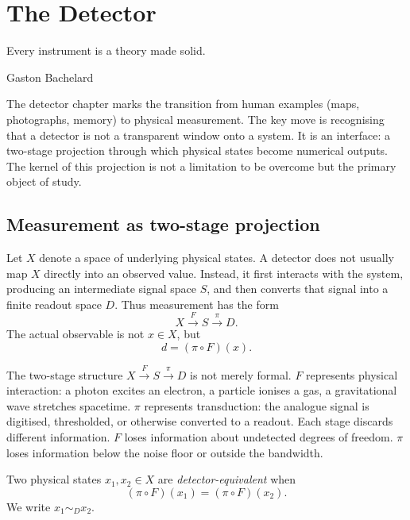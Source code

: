 
\chapter{The Detector}
\label{ch:detector}

\epigraph{%
  Every instrument is a theory made solid.%
}{Gaston Bachelard}

\begin{WhyMatters}
  The detector chapter marks the transition from human examples
  (maps, photographs, memory) to physical measurement.
  The key move is recognising that a detector is not a
  transparent window onto a system.
  It is an interface: a two-stage projection through which
  physical states become numerical outputs.
  The kernel of this projection is not a limitation to be
  overcome but the primary object of study.
\end{WhyMatters}

\section{Measurement as two-stage projection}

Let $X$ denote a space of underlying physical states.
A detector does not usually map $X$ directly into an observed
value.
Instead, it first interacts with the system, producing an
intermediate signal space $S$, and then converts that signal
into a finite readout space $D$.
Thus measurement has the form
\[
  X \xrightarrow{F} S \xrightarrow{\pi} D.
\]
The actual observable is not $x \in X$, but
\[
  d = (\pi \circ F)(x).
\]

\begin{TechNote}
  The two-stage structure $X \xrightarrow{F} S \xrightarrow{\pi}
  D$ is not merely formal.
  $F$ represents physical interaction: a photon excites an
  electron, a particle ionises a gas, a gravitational wave
  stretches spacetime.
  $\pi$ represents transduction: the analogue signal is
  digitised, thresholded, or otherwise converted to a readout.
  Each stage discards different information.
  $F$ loses information about undetected degrees of freedom.
  $\pi$ loses information below the noise floor or outside the
  bandwidth.
\end{TechNote}

\begin{definition}
  Two physical states $x_1, x_2 \in X$ are
  \emph{detector-equivalent} when
  \[
    (\pi \circ F)(x_1) = (\pi \circ F)(x_2).
  \]
  We write $x_1 \sim_D x_2$.
\end{definition}

